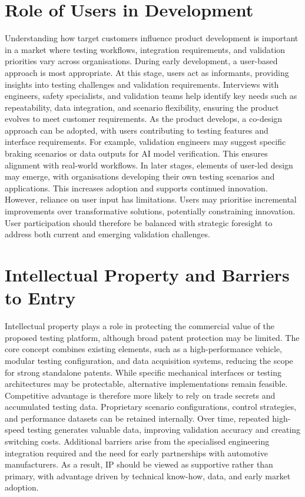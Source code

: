 \section{Role of Users in Development}

Understanding how target customers influence product development is important in a market where testing workflows, integration requirements, and validation priorities vary across organisations. During early development, a user-based approach is most appropriate. At this stage, users act as informants, providing insights into testing challenges and validation requirements. Interviews with engineers, safety specialists, and validation teams help identify key needs such as repeatability, data integration, and scenario flexibility, ensuring the product evolves to meet customer requirements.
As the product develops, a co-design approach can be adopted, with users contributing to testing features and interface requirements. For example, validation engineers may suggest specific braking scenarios or data outputs for AI model verification. This ensures alignment with real-world workflows.
In later stages, elements of user-led design may emerge, with organisations developing their own testing scenarios and applications. This increases adoption and supports continued innovation.
However, reliance on user input has limitations. Users may prioritise incremental improvements over transformative solutions, potentially constraining innovation. User participation should therefore be balanced with strategic foresight to address both current and emerging validation challenges.

\section{Intellectual Property and Barriers to Entry}

Intellectual property plays a role in protecting the commercial value of the proposed testing platform, although broad patent protection may be limited. The core concept combines existing elements, such as a high-performance vehicle, modular testing configuration, and data acquisition systems, reducing the scope for strong standalone patents. While specific mechanical interfaces or testing architectures may be protectable, alternative implementations remain feasible.
Competitive advantage is therefore more likely to rely on trade secrets and accumulated testing data. Proprietary scenario configurations, control strategies, and performance datasets can be retained internally. Over time, repeated high-speed testing generates valuable data, improving validation accuracy and creating switching costs.
Additional barriers arise from the specialised engineering integration required and the need for early partnerships with automotive manufacturers. As a result, IP should be viewed as supportive rather than primary, with advantage driven by technical know-how, data, and early market adoption.

